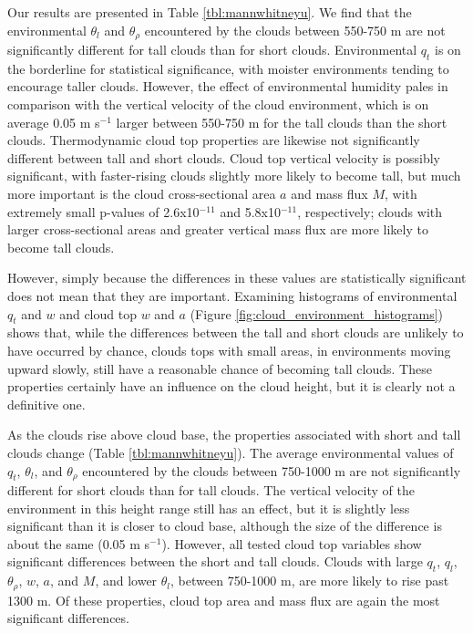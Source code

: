 \documentclass[acp]{copernicus}
\begin{document}
Our results are presented in Table \ref{tbl:mannwhitneyu}.  We find that the 
environmental $\theta_l$ and $\theta_\rho$ encountered by the clouds between 
550-750 m are not significantly different for tall clouds than for short 
clouds.  Environmental $q_t$ is on the borderline for statistical significance, 
with moister environments tending to encourage taller clouds.  However, the 
effect of environmental humidity pales in comparison with the vertical velocity 
of the cloud environment, which is on average 0.05 m s$^{-1}$ larger between 
550-750 m for the tall clouds than the short clouds.  Thermodynamic cloud top 
properties are likewise not significantly different between tall and short 
clouds.  Cloud top vertical velocity is possibly significant, with 
faster-rising clouds slightly more likely to become tall, but much more 
important is the cloud cross-sectional area $a$ and mass flux $M$, with 
extremely small p-values of 2.6x10$^{-11}$ and 5.8x10$^{-11}$, respectively; 
clouds with larger cross-sectional areas and greater vertical mass flux are 
more likely to become tall clouds.

However, simply because the differences in these values are statistically 
significant does not mean that they are important.  Examining histograms of 
environmental $q_t$ and $w$ and cloud top $w$ and $a$ (Figure 
\ref{fig:cloud_environment_histograms}) shows that, while the differences 
between the tall and short clouds are unlikely to have occurred by chance, 
clouds tops with small areas, in environments moving upward slowly, still have 
a reasonable chance of becoming tall clouds.  These properties certainly have 
an influence on the cloud height, but it is clearly not a definitive one.

As the clouds rise above cloud base, the properties associated with short and 
tall clouds change (Table \ref{tbl:mannwhitneyu}).  The average environmental 
values of $q_t$, $\theta_l$, and $\theta_\rho$ encountered by the clouds 
between 750-1000 m are not significantly different for short clouds than for 
tall clouds.  The vertical velocity of the environment in this height range 
still has an effect, but it is slightly less significant than it is closer to 
cloud base, although the size of the difference is about the same 
(0.05 m s$^{-1}$).  However, all tested cloud top variables show significant 
differences between the short and tall clouds.  Clouds with large $q_t$, $q_l$, 
$\theta_\rho$, $w$, $a$, and $M$, and lower $\theta_l$, between 750-1000 m, 
are more likely to rise past 1300 m.  Of these properties, cloud top area and 
mass flux are again the most significant differences.
\end{document}

